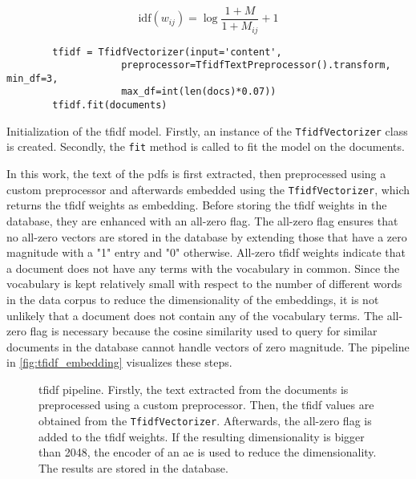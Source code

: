 \begin{equation}
    \text{idf}(w_{ij}) = \log \frac{1 + M}{1 + M_{ij}} + 1    
    \label{eq:tfidf-scikit-learn}
\end{equation}

\begin{listing}[htp]
    \begin{verbatim}
        tfidf = TfidfVectorizer(input='content', 
                    preprocessor=TfidfTextPreprocessor().transform, min_df=3, 
                    max_df=int(len(docs)*0.07))
        tfidf.fit(documents)
    \end{verbatim}
    \caption[Initialization of the \ac{tfidf} model]{Initialization of the \ac{tfidf} model.
    Firstly, an instance of the \texttt{TfidfVectorizer} class is created.
    Secondly, the \texttt{fit} method is called to fit the model on the documents.
    }
    \label{lst:impl-tfidf}
\end{listing}

In this work, the text of the \acp{pdf} is first extracted, then preprocessed using a custom preprocessor and afterwards embedded using the \texttt{TfidfVectorizer},
which returns the \ac{tfidf} weights as embedding.
Before storing the \ac{tfidf} weights in the database, they are enhanced with an all-zero flag.
The all-zero flag ensures that no all-zero vectors are stored in the database by extending those that have a zero magnitude with a "1" entry and "0" otherwise.
All-zero \ac{tfidf} weights indicate that a document does not have any terms with the vocabulary in common.
Since the vocabulary is kept relatively small with respect to the number of different words in the data corpus to reduce the dimensionality of the embeddings, 
it is not unlikely that a document does not contain any of the vocabulary terms.
The all-zero flag is necessary because the cosine similarity used to query for similar documents in the database cannot handle vectors of zero magnitude.
The pipeline in \autoref{fig:tfidf_embedding} visualizes these steps.

\begin{figure}[h] %
    \centering
    
    \caption[\ac{tfidf} pipeline]{\ac{tfidf} pipeline.
    Firstly, the text extracted from the documents is preprocessed using a custom preprocessor.
    Then, the \ac{tfidf} values are obtained from the \texttt{TfidfVectorizer}.
    Afterwards, the all-zero flag is added to the \ac{tfidf} weights.
    If the resulting dimensionality is bigger than 2048, the encoder of an \ac{ae} is used to reduce the dimensionality.
    The results are stored in the database.
    }
    \label{fig:tfidf_embedding}
\end{figure}

